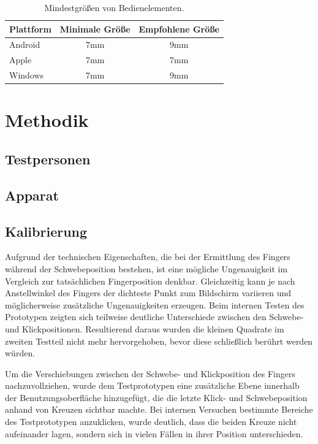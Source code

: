 \documentclass[a4paper,12pt,bibliography=totoc]{scrreprt}%
\begin{document}
\begin{table}
\centering
\renewcommand{\arraystretch}{1.5}
\setlength{\tabcolsep}{15pt}
\begin{tabular}{ l c c }
Plattform & Minimale Größe & Empfohlene Größe\\\hline
Android \cite{androidrichtlinien} & 7mm & 9mm\\
Apple \cite{applerichtlinien} & 7mm & 7mm\\
Windows \cite{winrichtlinien} & 7mm & 9mm\\
\end{tabular}
\caption{Mindestgrößen von Bedienelementen.}
\label{leitfadenalle}
\end{table}


\chapter{Methodik}


\section{Testpersonen}


\section{Apparat}


\section{Kalibrierung}
Aufgrund der technischen Eigenschaften, die bei der Ermittlung des Fingers während der Schwebeposition bestehen, ist eine mögliche Ungenauigkeit im Vergleich zur tatsächlichen Fingerposition denkbar. Gleichzeitig kann je nach Anstellwinkel des Fingers der dichteste Punkt zum Bildschirm variieren und möglicherweise zusätzliche Ungenauigkeiten erzeugen. Beim internen Testen des Prototypen zeigten sich teilweise deutliche Unterschiede zwischen den Schwebe- und Klickpositionen. Resultierend daraus wurden die kleinen Quadrate im zweiten Testteil nicht mehr hervorgehoben, bevor diese schließlich berührt werden würden.

Um die Verschiebungen zwischen der Schwebe- und Klickposition des Fingers nachzuvollziehen, wurde dem Testprototypen eine zusätzliche Ebene innerhalb der Benutzungsoberfläche hinzugefügt, die die letzte Klick- und Schwebeposition anhand von Kreuzen sichtbar machte. Bei internen Versuchen bestimmte Bereiche des Testprototypen anzuklicken, wurde deutlich, dass die beiden Kreuze nicht aufeinander lagen, sondern sich in vielen Fällen in ihrer Position unterschieden.
\end{document}
